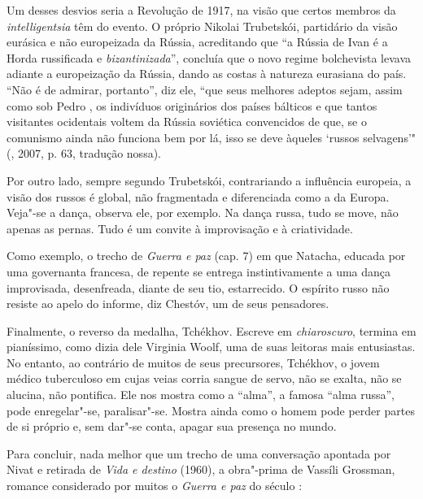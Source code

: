 Um desses desvios seria a Revolução de 1917, na visão que certos membros da \emph{intelligentsia} têm do evento. O próprio Nikolai Trubetskói, partidário da visão eurásica e não europeizada da Rússia, acreditando que ``a Rússia de Ivan  é a Horda russificada e \emph{bizantinizada}'', concluía que o novo regime bolchevista levava adiante a europeização da Rússia, dando as costas à natureza eurasiana do país. ``Não é de admirar, portanto'', diz ele, ``que seus melhores adeptos sejam, assim como sob Pedro , os indivíduos originários dos países bálticos e que tantos visitantes ocidentais voltem da Rússia
soviética convencidos de que, se o comunismo ainda não funciona bem por lá, isso se deve àqueles `russos selvagens'" (, 2007, p. 63, tradução nossa).

Por outro lado, sempre segundo Trubetskói, contrariando a influência europeia, a visão dos russos é global, não fragmentada e diferenciada como a da Europa. Veja"-se a dança, observa ele, por exemplo. Na dança russa, tudo se move, não apenas as pernas. Tudo é um convite à improvisação e à criatividade.

Como exemplo, o trecho de \emph{Guerra e paz} (cap. 7) em que Natacha, educada por uma governanta francesa, de repente se entrega
instintivamente a uma dança improvisada, desenfreada, diante de seu tio, estarrecido. O espírito russo não resiste ao apelo do informe, diz Chestóv, um de seus pensadores.

Finalmente, o reverso da medalha, Tchékhov. Escreve em \emph{chiaroscuro}, termina em pianíssimo, como dizia dele Virginia Woolf, uma de suas leitoras mais entusiastas. No entanto, ao contrário de muitos de seus precursores, Tchékhov, o jovem médico tuberculoso em cujas veias corria sangue de servo, não se exalta, não se alucina, não pontifica. Ele nos mostra como a ``alma'', a famosa ``alma russa'', pode enregelar"-se, paralisar"-se. Mostra ainda como o homem pode perder partes de si próprio e, sem dar"-se conta, apagar sua presença no mundo.

Para concluir, nada melhor que um trecho de uma conversação apontada por Nivat e retirada de \emph{Vida e destino} (1960), a obra"-prima de Vassíli Grossman, romance considerado por muitos o \emph{Guerra e paz} do século :

